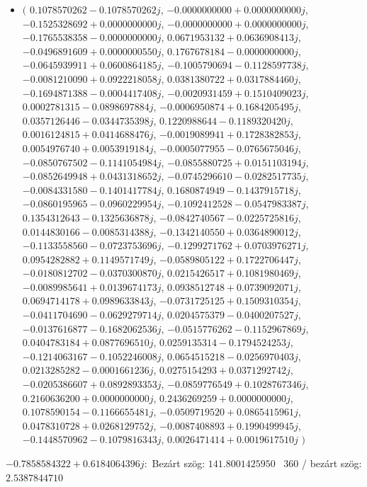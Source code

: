 \documentclass[14pt,a4paper]{article}
\begin{document}
\begin{itemize}
\item
$\big($
$0.1078570262-0.1078570262j$, $-0.0000000000+0.0000000000j$, $-0.1525328692+0.0000000000j$, $-0.0000000000+0.0000000000j$, $-0.1765538358-0.0000000000j$, $0.0671953132+0.0636908413j$, $-0.0496891609+0.0000000550j$, $0.1767678184-0.0000000000j$, $-0.0645939911+0.0600864185j$, $-0.1005790694-0.1128597738j$, $-0.0081210090+0.0922218058j$, $0.0381380722+0.0317884460j$, $-0.1694871388-0.0004417408j$, $-0.0020931459+0.1510409023j$, $0.0002781315-0.0898697884j$, $-0.0006950874+0.1684205495j$, $0.0357126446-0.0344735398j$, $0.1220988644-0.1189320420j$, $0.0016124815+0.0414688476j$, $-0.0019089941+0.1728382853j$, $0.0054976740+0.0053919184j$, $-0.0005077955-0.0765675046j$, $-0.0850767502-0.1141054984j$, $-0.0855880725+0.0151103194j$, $-0.0852649948+0.0431318652j$, $-0.0745296610-0.0282517735j$, $-0.0084331580-0.1401417784j$, $0.1680874949-0.1437915718j$, $-0.0860195965-0.0960229954j$, $-0.1092412528-0.0547983387j$, $0.1354312643-0.1325636878j$, $-0.0842740567-0.0225725816j$, $0.0144830166-0.0085314388j$, $-0.1342140550+0.0364890012j$, $-0.1133558560-0.0723753696j$, $-0.1299271762+0.0703976271j$, $0.0954282882+0.1149571749j$, $-0.0589805122+0.1722706447j$, $-0.0180812702-0.0370300870j$, $0.0215426517+0.1081980469j$, $-0.0089985641+0.0139674173j$, $0.0938512748+0.0739092071j$, $0.0694714178+0.0989633843j$, $-0.0731725125+0.1509310354j$, $-0.0411704690-0.0629279714j$, $0.0204575379-0.0400207527j$, $-0.0137616877-0.1682062536j$, $-0.0515776262-0.1152967869j$, $0.0404783184+0.0877696510j$, $0.0259135314-0.1794524253j$, $-0.1214063167-0.1052246008j$, $0.0654515218-0.0256970403j$, $0.0213285282-0.0001661236j$, $0.0275154293+0.0371292742j$, $-0.0205386607+0.0892893353j$, $-0.0859776549+0.1028767346j$, $0.2160636200+0.0000000000j$, $0.2436269259+0.0000000000j$, $0.1078590154-0.1166655481j$, $-0.0509719520+0.0865415961j$, $0.0478310728+0.0268129752j$, $-0.0087408893+0.1990499945j$, $-0.1448570962-0.1079816343j$, $0.0026471414+0.0019617510j$
$\big)$
\end{itemize}
$-0.7858584322+0.6184064396j$:\
Bezárt szög: $141.8001425950$ \
360 / bezárt szög: $2.5387844710$\
\end{document}
